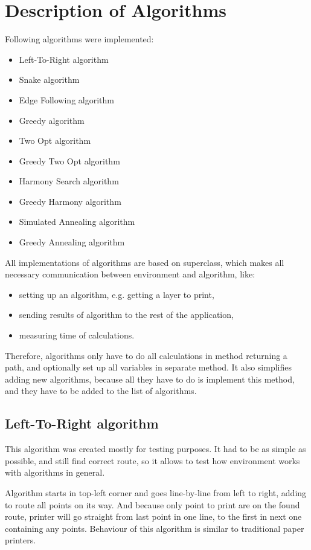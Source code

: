 \documentclass[titlepage]{article}
\begin{document}
\section{Description of Algorithms}
Following algorithms were implemented:
\begin{itemize}
\item Left-To-Right algorithm
\item Snake algorithm
\item Edge Following algorithm
\item Greedy algorithm
\item Two Opt algorithm
\item Greedy Two Opt algorithm
\item Harmony Search algorithm
\item Greedy Harmony algorithm
\item Simulated Annealing algorithm
\item Greedy Annealing algorithm

\end{itemize}
All implementations of algorithms are based on superclass, which makes all necessary communication between environment and algorithm, like:
\begin{itemize}
\item setting up an algorithm, e.g. getting a layer to print,
\item sending results of algorithm to the rest of the application,
\item measuring time of calculations.
\end{itemize}
Therefore, algorithms only have to do all calculations in method returning a path, and optionally set up all variables in separate method. It also simplifies adding new algorithms, because all they have to do is implement this method, and they have to be added to the list of algorithms.

\subsection{Left-To-Right algorithm}
This algorithm was created mostly for testing purposes. It had to be as simple as possible, and still find correct route, so it allows to test how environment works with algorithms in general.

Algorithm starts in top-left corner and goes line-by-line from left to right, adding to route all points on its way. And because only point to print are on the found route, printer will go straight from last point in one line, to the first in next one containing any points. Behaviour of this algorithm is similar to traditional paper printers.
\end{document}
